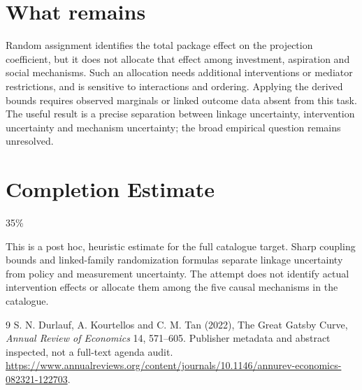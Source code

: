 \documentclass[11pt]{article}
\begin{document}
\section*{What remains}
Random assignment identifies the total package effect on the projection coefficient, but it does not allocate that effect among investment, aspiration and social mechanisms. Such an allocation needs additional interventions or mediator restrictions, and is sensitive to interactions and ordering. Applying the derived bounds requires observed marginals or linked outcome data absent from this task. The useful result is a precise separation between linkage uncertainty, intervention uncertainty and mechanism uncertainty; the broad empirical question remains unresolved.

\section{Completion Estimate}
35\%

This is a post hoc, heuristic estimate for the full catalogue target.
Sharp coupling bounds and linked-family randomization formulas separate linkage uncertainty from policy and measurement uncertainty. The attempt does not identify actual intervention effects or allocate them among the five causal mechanisms in the catalogue.

\begin{thebibliography}{9}
 S. N. Durlauf, A. Kourtellos and C. M. Tan (2022), The Great Gatsby Curve, \emph{Annual Review of Economics} 14, 571--605. Publisher metadata and abstract inspected, not a full-text agenda audit. \url{https://www.annualreviews.org/content/journals/10.1146/annurev-economics-082321-122703}.
\end{thebibliography}
\end{document}
